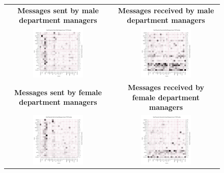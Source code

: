 \documentclass{pnastwo}
\begin{document}
\begin{article}
\begin{figure}
\centering
\begin{tabular}{cc}
\textbf{Messages sent by male department managers} & \textbf{Messages received by male department managers}\\
\includegraphics[width = 0.49\textwidth]{images/Male_Sent_Prop.pdf} &
\includegraphics[width = 0.49\textwidth]{images/Male_Received_Prop.pdf} \\
\textbf{Messages sent by female department managers} & \textbf{Messages received by female department managers}\\
\includegraphics[width = 0.49\textwidth]{images/Female_Sent_Prop.pdf} &
\includegraphics[width = 0.49\textwidth]{images/Female_Received_Prop.pdf}

\end{tabular}
\end{figure}
\end{article}
\end{document}
